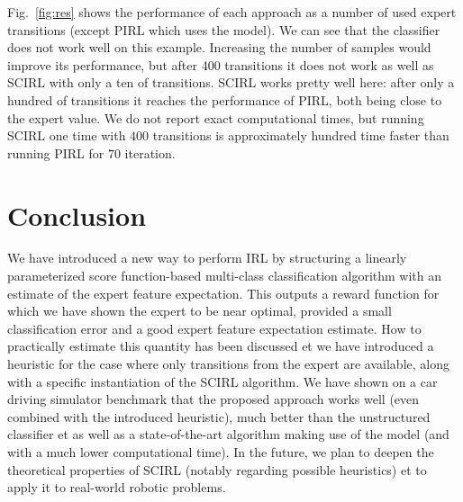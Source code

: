 \documentclass[english,utf8]{./hermes-journal}
\begin{document}
Fig.~\ref{fig:res} shows the performance of each approach as a
number of used expert transitions (except PIRL which uses the
model). We can see that the classifier does not work well on this
example. Increasing the number of samples would improve its
performance, but after 400 transitions it does not work as well as
SCIRL with only a ten of transitions. SCIRL works pretty well here:
after only a hundred of transitions it reaches the performance of
PIRL, both being close to the expert value. We do not report exact
computational times, but running SCIRL one time with $400$
transitions is approximately hundred time faster than running PIRL
for $70$ iteration.
%



\section{Conclusion}
\label{sec:conclusion}

We have introduced a new way to perform IRL by structuring a
linearly parameterized score function-based multi-class
classification algorithm with an estimate of the expert feature
expectation. This outputs a reward function for which we have shown
the expert to be near optimal, provided a small classification error
and a good expert feature expectation estimate. How to practically
estimate this quantity has been  discussed et we have introduced a
heuristic for the case where only transitions from the expert are
available, along with a specific instantiation of the SCIRL
algorithm. We have shown on a car driving simulator benchmark that
the proposed approach works well (even combined with the introduced
heuristic), much better than the unstructured classifier et as well
as a state-of-the-art algorithm making use of the model (and with a
much lower computational time). In the future, we plan to deepen the
theoretical properties of SCIRL (notably regarding possible
heuristics) et to apply it to real-world robotic problems.


\newpage

\end{document}
